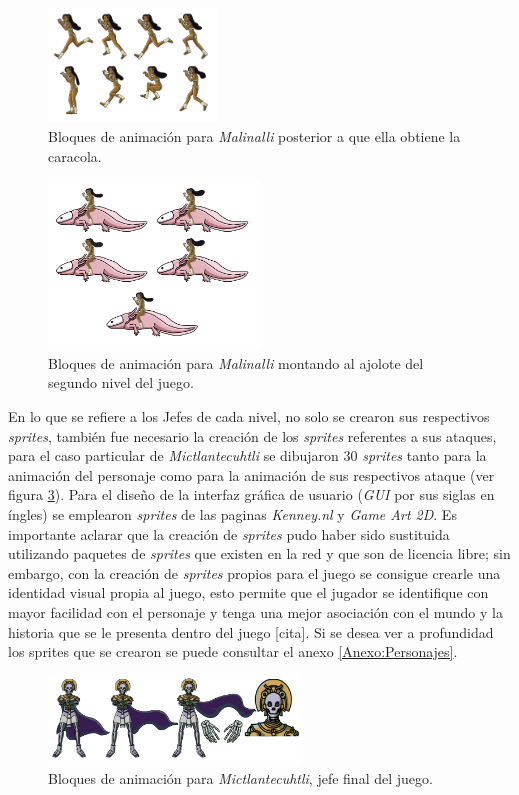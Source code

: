 \begin{figure}[h]
	\centering
	\includegraphics[width=0.4\textwidth]{03TrabajoRealizado/imagenes/MalinalliArma.png}
 	\caption{Bloques de animación para \textit{Malinalli} posterior a que ella obtiene la caracola.}
	\label{fig:MalinalliCaracola}		
\end{figure}

\begin{figure}[h]
	\centering
	\includegraphics[width=0.5\textwidth]{03TrabajoRealizado/imagenes/MalinaliAjolote.png}
 	\caption{Bloques de animación para \textit{Malinalli} montando al ajolote del segundo nivel del juego.}
	\label{fig:MalinalliAjolote}		
\end{figure}

En lo que se refiere a los Jefes de cada nivel, no solo se crearon sus 
respectivos \textit{sprites}, también fue necesario la creación de los 
\textit{sprites} referentes a sus ataques, para el caso particular de 
\textit{Mictlantecuhtli} se dibujaron 30 \textit{sprites} tanto para la animación 
del personaje como para la animación de sus respectivos ataque (ver figura 
\ref{fig:Mictlantecutli}). Para el diseño de la interfaz gráfica de usuario
(\textit{GUI} por sus siglas en íngles) se emplearon \textit{sprites} de las 
paginas \textit{Kenney.nl} y \textit{Game Art 2D}. Es importante aclarar que la 
creación de \textit{sprites} pudo haber sido sustituida utilizando paquetes de 
\textit{sprites} que existen en la red y que son de licencia libre; sin embargo, 
con la creación de \textit{sprites} propios para el juego se consigue crearle una 
identidad visual propia al juego, esto permite que el jugador se identifique con 
mayor facilidad con el personaje y tenga una mejor asociación con el mundo y la 
historia que se le presenta dentro del juego [cita]. Si se desea ver a profundidad 
los {sprites} que se crearon se puede consultar el anexo \ref{Anexo:Personajes}. 


\begin{figure}[h]
	\centering
	\includegraphics[width=0.6\textwidth]{03TrabajoRealizado/imagenes/Mictlantecuhtli.png}
 	\caption{Bloques de animación para \textit{Mictlantecuhtli}, jefe final del juego.}
	\label{fig:Mictlantecutli}		
\end{figure}